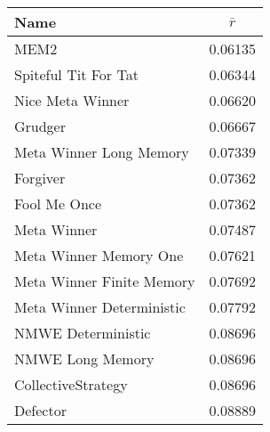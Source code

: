 \begin{tabular}{lc}
\toprule
Name                      &  $\bar{r}$ \\
\midrule
MEM2                      &    0.06135 \\
Spiteful Tit For Tat      &    0.06344 \\
Nice Meta Winner          &    0.06620 \\
Grudger                   &    0.06667 \\
Meta Winner Long Memory   &    0.07339 \\
Forgiver                  &    0.07362 \\
Fool Me Once              &    0.07362 \\
Meta Winner               &    0.07487 \\
Meta Winner Memory One    &    0.07621 \\
Meta Winner Finite Memory &    0.07692 \\
Meta Winner Deterministic &    0.07792 \\
NMWE Deterministic        &    0.08696 \\
NMWE Long Memory          &    0.08696 \\
CollectiveStrategy        &    0.08696 \\
Defector                  &    0.08889 \\
\bottomrule
\end{tabular}
